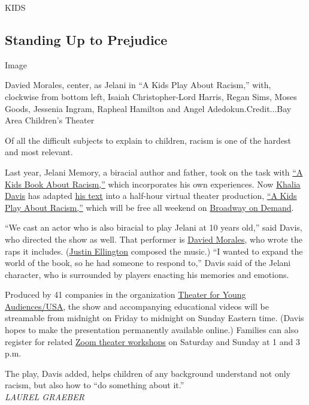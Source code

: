 KIDS

\hypertarget{standing-up-to-prejudice}{%
\subsection{Standing Up to Prejudice}\label{standing-up-to-prejudice}}

Image

Davied Morales, center, as Jelani in ``A Kids Play About Racism,'' with,
clockwise from bottom left, Isaiah Christopher-Lord Harris, Regan Sims,
Moses Goods, Jessenia Ingram, Rapheal Hamilton and Angel
Adedokun.Credit...Bay Area Children's Theater

Of all the difficult subjects to explain to children, racism is one of
the hardest and most relevant.

Last year, Jelani Memory, a biracial author and father, took on the task
with
\href{https://akidsbookabout.com/products/a-kids-book-about-racism}{``A
Kids Book About Racism,''} which incorporates his own experiences. Now
\href{https://khaliadavis.com/}{Khalia Davis} has adapted
\href{https://www.youtube.com/watch?v=LnaltG5N8nE}{his text} into a
half-hour virtual theater production,
\href{https://www.akidsplayabout.org/}{``A Kids Play About Racism,''}
which will be free all weekend on
\href{https://www.broadwayondemand.com/series/teJ66dfuOEak-a-kids-play-about-racism}{Broadway
on Demand}.

``We cast an actor who is also biracial to play Jelani at 10 years
old,'' said Davis, who directed the show as well. That performer is
\href{https://www.youtube.com/watch?v=gWPOrq7qt_g}{Davied Morales}, who
wrote the raps it includes.
(\href{http://www.justinellington.com/}{Justin Ellington} composed the
music.) ``I wanted to expand the world of the book, so he had someone to
respond to,'' Davis said of the Jelani character, who is surrounded by
players enacting his memories and emotions.

Produced by 41 companies in the organization
\href{http://www.tyausa.org/}{Theater for Young Audiences/USA}, the show
and accompanying educational videos will be streamable from midnight on
Friday to midnight on Sunday Eastern time. (Davis hopes to make the
presentation permanently available online.) Families can also register
for related \href{https://www.akidsplayabout.org/more}{Zoom theater
workshops} on Saturday and Sunday at 1 and 3 p.m.

The play, Davis added, helps children of any background understand not
only racism, but also how to ``do something about it.''\\
\emph{LAUREL GRAEBER}

